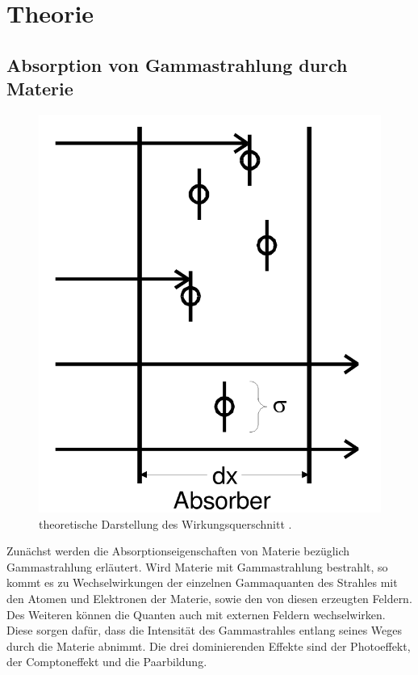 
\section{Theorie}
\label{sec:Theorie}
\subsection{Absorption von Gammastrahlung durch Materie}

\begin{figure}
	\centering
	\includegraphics[width=\linewidth-250pt,height=\textheight-250pt,keepaspectratio]{content/Images/aborber.png}
    \caption{theoretische Darstellung des Wirkungsquerschnitt  \cite{V18}.}
    \label{fig:aborb}
\end{figure}

Zunächst werden die Absorptionseigenschaften von Materie bezüglich Gammastrahlung erläutert.
Wird Materie mit Gammastrahlung bestrahlt, so kommt es zu Wechselwirkungen der einzelnen Gammaquanten des Strahles mit den Atomen und Elektronen der Materie, sowie den von diesen erzeugten Feldern. Des Weiteren können die Quanten auch mit externen Feldern wechselwirken.
 Diese sorgen dafür, dass die Intensität des Gammastrahles entlang seines Weges durch die Materie abnimmt. Die drei dominierenden Effekte sind der Photoeffekt, der Comptoneffekt und die Paarbildung.

